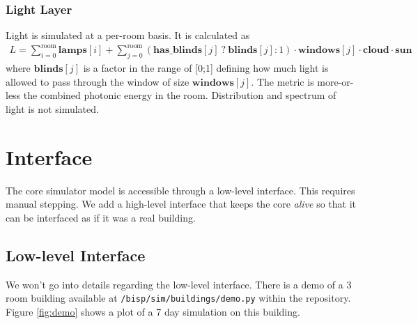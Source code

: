 \documentclass[10pt]{article}
\begin{document}
\subsubsection{Light Layer}

Light is simulated at a per-room basis. It is calculated as
\begin{eqnarray}
  \nonumber L =
            \sum\limits_{i=0}^{\mathrm{room}} \mathbf{lamps}[i] +
            \sum\limits_{j=0}^{\mathrm{room}}
            \left(
              \mathbf{has\_blinds}[j] ~?~ \mathbf{blinds}[j] : 1
            \right) \cdot \mathbf{windows}[j] \cdot \mathbf{cloud} \cdot \mathbf{sun}
\end{eqnarray}
where $\mathbf{blinds}[j]$ is a factor in the range of [0;1] defining how much light is allowed to pass through the window of size $\mathbf{windows}[j]$. The metric is more-or-less the combined photonic energy in the room. Distribution and spectrum of light is not simulated.


\section{Interface}
\label{sec:interface}

The core simulator model is accessible through a low-level interface. This requires manual stepping. We add a high-level interface that keeps the core \textsl{alive} so that it can be interfaced as if it was a real building.

\subsection{Low-level Interface}

We won't go into details regarding the low-level interface. There is a demo of a 3 room building available at \texttt{/bisp/sim/buildings/demo.py} within the repository. Figure \ref{fig:demo} shows a plot of a 7 day simulation on this building.
\end{document}
